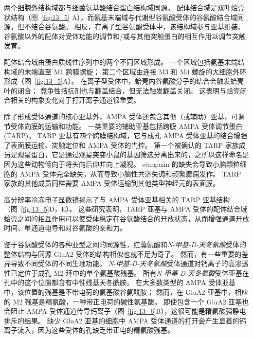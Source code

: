 两个细胞外结构域都与细菌氨基酸结合蛋白结构域同源。 配体结合域是双叶蛤壳状结构（图~\ref{fig:13_5} A），而氨基末端域与代谢型谷氨酸受体的谷氨酸结合域同源，但不结合谷氨酸。
相反，在离子型谷氨酸受体中，该结构域参与亚基组装、谷氨酸以外的配体对受体功能的调节和/或与其他突触蛋白的相互作用以调节突触发育。


配体结合域由蛋白质线性序列中的两个不同区域形成。
一个区域包括氨基末端结构域的末端直至 M1 跨膜螺旋；
第二个区域由连接 M3 和 M4 螺旋的大细胞外环形成（图~\ref{fig:13_5}A）。
在离子型受体中，蛤壳内谷氨酸分子的结合会触发蛤壳叶的闭合；
竞争性拮抗剂也与翻盖结合，但无法触发翻盖关闭。
这表明与蛤壳闭合相关的构象变化对于打开离子通道很重要。


除了形成受体通道的核心亚基外，AMPA 受体还包含其他（或辅助）亚基，可调节受体向膜的运输和功能。
一类重要的辅助亚基包括跨膜 AMPA 受体调节蛋白 (TARP)。
TARP 亚基有四个跨膜结构域，它与成孔 AMPA 受体亚基的结合增强了表面膜运输、突触定位和 AMPA 受体的门控。
第一个被确认的 TARP 家族成员是观星蛋白，它是通过观星突变小鼠的基因筛选分离出来的，之所以这样命名是因为这些动物倾向于将头向后仰并向上凝视。
stargazin 的缺失会导致小脑颗粒细胞的 AMPA 受体完全缺失，从而导致小脑性共济失调和频繁癫痫发作。
TARP 家族的其他成员同样需要 AMPA 受体运输到其他类型神经元的表面膜。


高分辨率冷冻电子显微镜揭示了与 AMPA 受体亚基相关的 TARP 亚基结构（图~\ref{fig:13_5}D，E）。
这些研究表明，TARP 亚基与 AMPA 受体的配体结合域蛤壳之间的相互作用可以使受体稳定在谷氨酸结合的开放状态，从而增强通道开放时间、单通道电导和对谷氨酸的亲和力。


鉴于谷氨酸受体的各种亚型之间的同源性，红藻氨酸和\textit{N-甲基-D-天冬氨酸}受体的整体结构与同源 GluA2 受体的结构相似也就不足为奇了。
然而，有一些重要的差异导致不同受体的不同生理功能。 
\textit{N-甲基-D-天冬氨酸}受体通道对钙离子的高渗透性已定位于成孔 M2 环中的单个氨基酸残基。
所有\textit{N-甲基-D-天冬氨酸}受体亚基在孔中的这个位置都含有中性残基天冬酰胺。
在大多数类型的 AMPA 受体亚基中，该位置的残基是不带电荷的氨基酸谷氨酰胺；
然而，在 GluA2 亚基中，相应的 M2 残基是精氨酸，一种带正电荷的碱性氨基酸。
即使包含一个 GluA2 亚基也会阻止 AMPA 受体通道传导钙离子（图~\ref{fig:13_6}B），这很可能是精氨酸强静电排斥的结果。
缺少 GluA2 亚基的细胞中 AMPA 受体通道的打开会产生显着的钙离子流入，因为这些受体的孔缺乏带正电的精氨酸残基。


